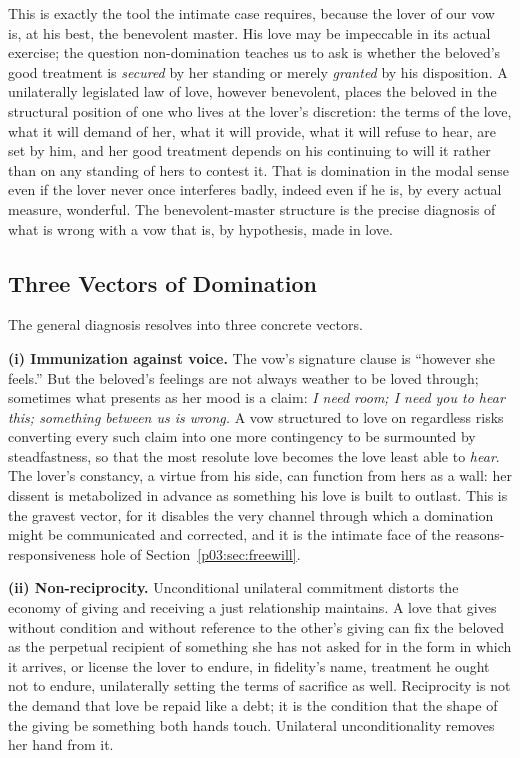 This is exactly the tool the intimate case requires, because the lover of our vow is, at his best, the benevolent master. His love may be impeccable in its actual exercise; the question non-domination teaches us to ask is whether the beloved's good treatment is \emph{secured} by her standing or merely \emph{granted} by his disposition. A unilaterally legislated law of love, however benevolent, places the beloved in the structural position of one who lives at the lover's discretion: the terms of the love, what it will demand of her, what it will provide, what it will refuse to hear, are set by him, and her good treatment depends on his continuing to will it rather than on any standing of hers to contest it. That is domination in the modal sense even if the lover never once interferes badly, indeed even if he is, by every actual measure, wonderful. The benevolent-master structure is the precise diagnosis of what is wrong with a vow that is, by hypothesis, made in love.

\subsection{Three Vectors of Domination}

The general diagnosis resolves into three concrete vectors.

\textbf{(i) Immunization against voice.} The vow's signature clause is ``however she feels.'' But the beloved's feelings are not always weather to be loved through; sometimes what presents as her mood is a claim: \emph{I need room; I need you to hear this; something between us is wrong.} A vow structured to love on regardless risks converting every such claim into one more contingency to be surmounted by steadfastness, so that the most resolute love becomes the love least able to \emph{hear}. The lover's constancy, a virtue from his side, can function from hers as a wall: her dissent is metabolized in advance as something his love is built to outlast. This is the gravest vector, for it disables the very channel through which a domination might be communicated and corrected, and it is the intimate face of the reasons-responsiveness hole of Section~\ref{p03:sec:freewill}.

\textbf{(ii) Non-reciprocity.} Unconditional unilateral commitment distorts the economy of giving and receiving a just relationship maintains. A love that gives without condition and without reference to the other's giving can fix the beloved as the perpetual recipient of something she has not asked for in the form in which it arrives, or license the lover to endure, in fidelity's name, treatment he ought not to endure, unilaterally setting the terms of sacrifice as well. Reciprocity is not the demand that love be repaid like a debt; it is the condition that the shape of the giving be something both hands touch. Unilateral unconditionality removes her hand from it.

